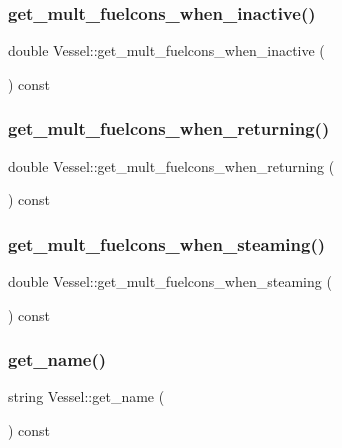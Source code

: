 \subsubsection{\texorpdfstring{get\_mult\_fuelcons\_when\_inactive()}{get\_mult\_fuelcons\_when\_inactive()}}
{\footnotesize\ttfamily double Vessel\+::get\+\_\+mult\+\_\+fuelcons\+\_\+when\+\_\+inactive (\begin{DoxyParamCaption}{ }\end{DoxyParamCaption}) const}

\mbox{\label{class_vessel_ab4898c7c036fad525d629b6105e95e88}} 
\subsubsection{\texorpdfstring{get\_mult\_fuelcons\_when\_returning()}{get\_mult\_fuelcons\_when\_returning()}}
{\footnotesize\ttfamily double Vessel\+::get\+\_\+mult\+\_\+fuelcons\+\_\+when\+\_\+returning (\begin{DoxyParamCaption}{ }\end{DoxyParamCaption}) const}

\mbox{\label{class_vessel_aaee4c05d2d72598e429675738a771ded}} 
\subsubsection{\texorpdfstring{get\_mult\_fuelcons\_when\_steaming()}{get\_mult\_fuelcons\_when\_steaming()}}
{\footnotesize\ttfamily double Vessel\+::get\+\_\+mult\+\_\+fuelcons\+\_\+when\+\_\+steaming (\begin{DoxyParamCaption}{ }\end{DoxyParamCaption}) const}

\mbox{\label{class_vessel_a5a5c3091358b64ca136b3223fbf4364d}} 
\subsubsection{\texorpdfstring{get\_name()}{get\_name()}}
{\footnotesize\ttfamily string Vessel\+::get\+\_\+name (\begin{DoxyParamCaption}{ }\end{DoxyParamCaption}) const}


